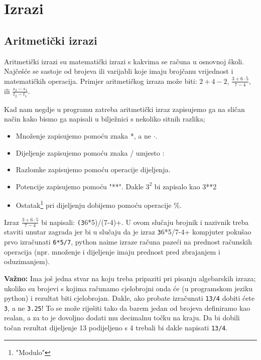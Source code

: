 \chapter{Izrazi}

\section{Aritmeti\v{c}ki izrazi}

Aritmeti\v{c}ki izrazi su matemati\v{c}ki izrazi s kakvima se ra\v{c}una u
osnovnoj \v{s}koli. Naj\v{c}e\v{s}\'{c}e se sastoje od brojeva ili varijabli
koje imaju broj\v{c}anu vrijednost i matemati\v{c}kih operacija. Primjer
aritmeti\v{c}kog izraza mo\v{z}e biti: 
$2+4-2$, 
$\displaystyle \frac{3+6\cdot 5}{7-4}$,
ili 
$\displaystyle \frac{s_2-s_1}{t_2-t_1}$. 

Kad nam negdje u programu zatreba
aritmeti\v{c}ki izraz zapisujemo ga na sli\v{c}an na\v{c}in kako bismo ga napisali u
bilje\v{z}nici s nekoliko sitnih razlika;

\begin{itemize}
	\item Mno\v{z}enje zapisujemo pomo\'{c}u znaka *, a ne $\cdot$.
	\item Dijeljenje zapisujemo pomo\'{c}u znaka / umjesto :
	\item Razlomke zapisujemo pomo\'{c}u operacije dijeljenja.
	\item Potencije zapisujemo pomo\'{c}u "**". Dakle $3^2$ bi zapisalo kao
		3**2
	\item Ostatak\footnote{"Modulo"} pri dijeljenju dobijemo pomo\'{c}u
		operacije \%.
\end{itemize}

Izraz 
$\displaystyle \frac{3+6\cdot 5}{7-4}$
bi napisali: \verb+(3+6*5)/(7-4)+. U ovom
slu\v{c}aju brojnik i nazivnik treba staviti unutar zagrada jer bi u
slu\v{c}aju da je izraz \verb+3+6*5/7-4+ kompjuter poku\v{s}ao prvo
izra\v{c}unati \verb+6*5/7+, python naime izraze ra\v{c}una paze\'{c}i na
prednost ra\v{c}unskih operacija (npr. mno\v{z}enje i dijeljenje imaju
prednost pred zbrajanjem i oduzimanjem).

\textbf{Va\v{z}no:}
Ima jo\v{s} jedna stvar na koju treba pripaziti pri pisanju algebarskih
izraza; ukoliko su brojevi s kojima ra\v{c}unamo cjelobrojni onda \'{c}e (u
programskom jeziku python) i rezultat biti cjelobrojan. Dakle, ako probate
izra\v{c}unati \verb+13/4+ dobiti \'{c}ete \verb+3+, a ne \verb+3.25+! To se
mo\v{z}e rije\v{s}iti tako da barem jedan od brojeva definiramo kao realan, a za
to je dovoljno dodati mu decimalnu to\v{c}ku na kraju. Da bi dobili to\v{c}an
rezultat dijeljenje 13 podijeljeno s 4 trebali bi dakle napisati
\verb+13/4+.

